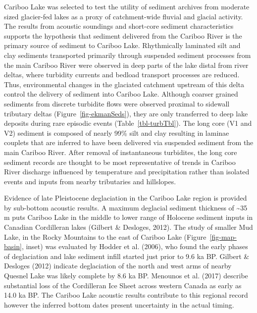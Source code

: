 \documentclass[
  letterpaper,
  DIV=11,
  numbers=noendperiod]{scrartcl}
\begin{document}
Cariboo Lake was selected to test the utility of sediment archives from
moderate sized glacier-fed lakes as a proxy of catchment-wide fluvial
and glacial activity. The results from acoustic soundings and short-core
sediment characteristics supports the hypothesis that sediment delivered
from the Cariboo River is the primary source of sediment to Cariboo
Lake. Rhythmically laminated silt and clay sediments transported
primarily through suspended sediment processes from the main Cariboo
River were observed in deep parts of the lake distal from river deltas,
where turbidity currents and bedload transport processes are reduced.
Thus, environmental changes in the glaciated catchment upstream of this
delta control the delivery of sediment into Cariboo Lake. Although
coarser grained sediments from discrete turbidite flows were observed
proximal to sidewall tributary deltas (Figure~\ref{fig-ekmanSeds}), they
are only transferred to deep lake deposits during rare episodic events
(Table~\ref{tbl-turbTbl}). The long core (V1 and V2) sediment is
composed of nearly 99\% silt and clay resulting in laminae couplets that
are inferred to have been delivered via suspended sediment from the main
Cariboo River. After removal of instantaneous turbidites, the long core
sediment records are thought to be most representative of trends in
Cariboo River discharge influenced by temperature and precipitation
rather than isolated events and inputs from nearby tributaries and
hillslopes.

Evidence of late Pleistocene deglaciation in the Cariboo Lake region is
provided by sub-bottom acoustic results. A maximum deglacial sediment
thickness of \textasciitilde35 m puts Cariboo Lake in the middle to
lower range of Holocene sediment inputs in Canadian Cordilleran lakes
(Gilbert \& Desloges, 2012). The study of smaller Mud Lake, in the Rocky
Mountains to the east of Cariboo Lake (Figure~\ref{fig-map-basin},
inset) was evaluated by Hodder et al. (2006), who found the early phases
of deglaciation and lake sediment infill started just prior to 9.6 ka
BP. Gilbert \& Desloges (2012) indicate deglaciation of the north and
west arms of nearby Quesnel Lake was likely complete by 8.6 ka BP.
Menounos et al. (2017) describe substantial loss of the Cordilleran Ice
Sheet across western Canada as early as 14.0 ka BP. The Cariboo Lake
acoustic results contribute to this regional record however the inferred
bottom dates present uncertainty in the actual timing.
\end{document}
